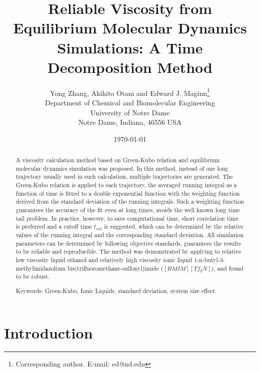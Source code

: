 \documentclass[12pt]{article}
\title{Reliable Viscosity from Equilibrium Molecular Dynamics Simulations: A Time Decomposition Method}
\author{Yong Zhang, Akihito Otani and Edward J. Maginn\thanks{Corresponding author. E-mail: ed@nd.edu} \\
                Department of Chemical and Biomolecular Engineering\\
                University of Notre Dame\\
                Notre Dame, Indiana, 46556 USA}
\date{\today}
\begin{document}

\maketitle

\newpage
\begin{abstract}

A viscosity calculation method based on Green-Kubo relation
and equilibrium molecular dynamics simulation was proposed.
In this method,
instead of one long trajectory usually used in such calculation,
multiple trajectories are generated.
The Green-Kubo relation is applied to each trajectory,
the averaged running integral as a function of time is fitted to a double exponential function
with the weighting function derived from the standard deviation of the running integrals.
Such a weighting function guarantees the accuracy of the fit even at long times,
avoids the well known long time tail problem.
In practice, however, to save computational time,
short correlation time is preferred and
a cutoff time $t_{cut}$ is suggested,
which can be determined by the relative values of the running integral and the corresponding standard deviation.
All simulation parameters can be determined by following objective standards,
guarantees the results to be reliable and reproducible.
The method was demonstrated by applying to relative low viscosity liquid ethanol and 
relatively high viscosity ionic liquid 1-n-butyl-3-methylimidazolium bis(trifluoromethane-sulfonyl)imide ($[BMIM][Tf_2N]$),
and found to be robust.
\newline

Keywords: Green-Kubo, Ionic Liquids, standard deviation, system size effect

\end{abstract}

\newpage
\section{Introduction}
\end{document}
